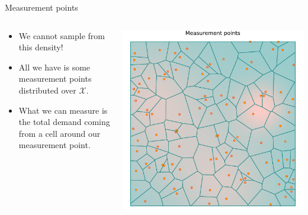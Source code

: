 \documentclass[aspectratio=169]{beamer}
\begin{document}
\begin{frame}{Measurement points}

	\vfill
	\begin{columns}
		\begin{column}{0.5\textwidth}
			\begin{itemize}
				\item We cannot sample from this density!
				\vspace{1cm}
				\item All we have is some \alert{measurement points} distributed over $\mathcal{X}$.
				\vspace{1cm}
				\item What we can measure is the total demand coming from a cell around our measurement point.
			\end{itemize}
		\end{column}
		\begin{column}{0.5\textwidth}
			\centering
			\includegraphics[width=0.9\columnwidth]{figuras/measurement_points.pdf}
		\end{column}
	\end{columns}

\end{frame}
\end{document}
